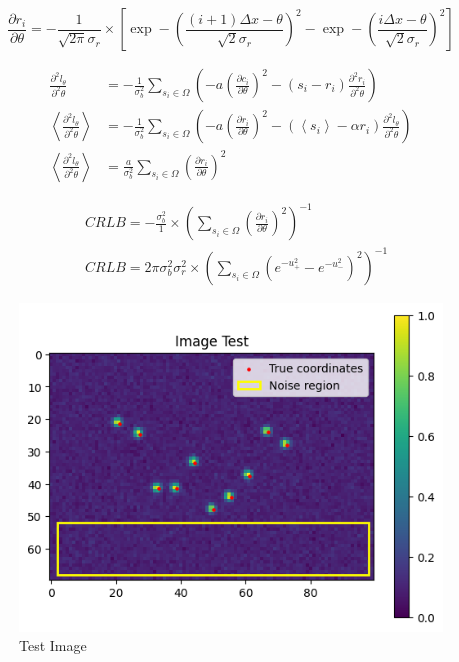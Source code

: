 \documentclass[10pt,letterpaper]{article}
\begin{document}
\begin{equation}
     \frac{\partial r_i}{\partial \theta}=-\frac{1}{\sqrt{2 \pi} \sigma_r} \times\left[\exp -\left(\frac{(i+1) \Delta x-\theta}{\sqrt{2} \sigma_r}\right)^2-\exp -\left(\frac{i\Delta x-\theta}{\sqrt{2} \sigma_r}\right)^2\right]
\end{equation}

\begin{align}
\frac{\partial^2 l_\theta}{\partial^2 \theta} &=-\frac{1}{\sigma_b^2} \sum_{s_i \in \Omega}\left(-a\left(\frac{\partial c_i}{\partial \theta}\right)^2-\left(s_i-r_i\right) \frac{\partial^2 r_i}{\partial^2 \theta}\right) \\
\left\langle\frac{\partial^2 l_\theta}{\partial^2 \theta}\right\rangle &=-\frac{1}{\sigma_b^2} \sum_{s_i \in \Omega}\left(-a\left(\frac{\partial r_i}{\partial \theta}\right)^2-\left(\left\langle s_i\right\rangle-\alpha r_i\right) \frac{\partial^2 l_\theta}{\partial^2 \theta}\right) \\
\left\langle\frac{\partial^2 l_\theta}{\partial^2 \theta}\right\rangle &=\frac{a}{\sigma_b^2} \sum_{s_i \in \Omega}\left(\frac{\partial r_i}{\partial \theta}\right)^2
\end{align}



\begin{align}
& C R L B=-\frac{\sigma_b^2}{1} \times\left(\sum_{s_i \in \Omega} \left(\frac{\partial r_i}{\partial \theta}\right)^2\right)^{-1} \\
& C R L B=2\pi\sigma_b^2\sigma_r^2 \times\left(\sum_{s_i \in \Omega}\left(e^{-u_+^2}-e^{-u_{-}^2}\right)^2\right)^{-1}
\end{align}


\begin{figure}[h]
	\centering
	\includegraphics[scale=0.65]{image-test.png}
	\caption{Test Image}
	\label{fig:test}
\end{figure}
\end{document}
